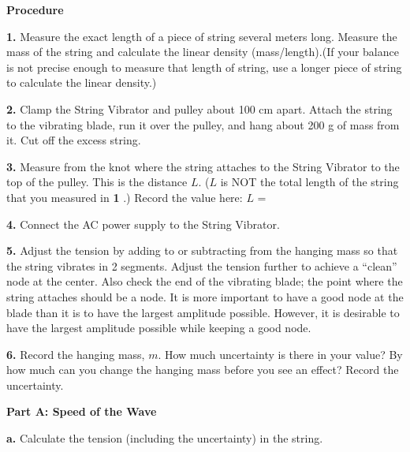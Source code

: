 \textbf{Procedure}

\textbf{1. } Measure the exact length of a piece of string several meters long. Measure the mass of the
string and calculate the linear density (mass/length).(If your balance is not precise enough to measure that length of string, use a longer
piece of string to calculate the linear density.)

\vspace{2cm}

\textbf{2. } Clamp the String Vibrator and pulley about 100 cm apart. Attach the string to the vibrating blade, run it over the pulley, and hang
about 200 g of mass from it. Cut off the excess string.

\textbf{3. } Measure from the knot where the string attaches to the String Vibrator to the top of the pulley.
This is the distance $L$. ($L$ is NOT the total length of the string that you measured in \textbf{1 }.) Record the value here: $L$ =

\vspace{0.3cm}
\begin{center}
\end{center}
\vspace{0.3cm}

\textbf{4. } Connect the AC power supply to the String Vibrator.

\textbf{5. } Adjust the tension by adding to or subtracting from the hanging mass so that the string vibrates in 2 segments. Adjust the tension
further to achieve a ``clean'' node at the center. Also check the end of the vibrating blade; the point where the string attaches should be a node.
It is more important to have a good node at the blade than it is to have the largest amplitude possible. However, it is desirable to have the
largest amplitude possible while keeping a good node.

\textbf{6. } Record the hanging mass, $m$. How much uncertainty is there in your value? By how much can you change the hanging mass before you see
an effect? Record the uncertainty.

\vspace{3cm}

\textbf{Part A: Speed of the Wave }

\textbf{a. } Calculate the tension (including the uncertainty) in the string.

\vspace{3cm}

\newpage

